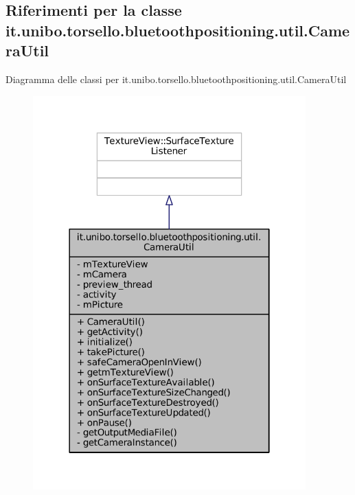 \hypertarget{classit_1_1unibo_1_1torsello_1_1bluetoothpositioning_1_1util_1_1CameraUtil}{}\subsection{Riferimenti per la classe it.\+unibo.\+torsello.\+bluetoothpositioning.\+util.\+Camera\+Util}
\label{classit_1_1unibo_1_1torsello_1_1bluetoothpositioning_1_1util_1_1CameraUtil}


Diagramma delle classi per it.\+unibo.\+torsello.\+bluetoothpositioning.\+util.\+Camera\+Util
\nopagebreak
\begin{figure}[H]
\begin{center}
\leavevmode
\includegraphics[width=298pt]{classit_1_1unibo_1_1torsello_1_1bluetoothpositioning_1_1util_1_1CameraUtil__inherit__graph}
\end{center}
\end{figure}



